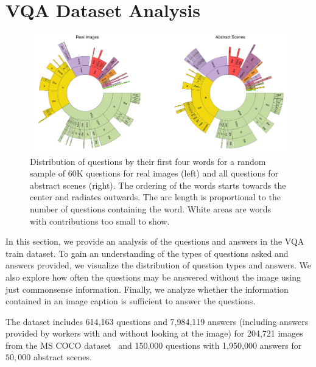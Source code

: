 \section{VQA Dataset Analysis}
\label{sec:analysis}
\begin{figure}[t]
\centering
\includegraphics[width=1\linewidth]{figures/QuestionTypes3.pdf}
\caption{Distribution of questions by their first four words for a random sample of 60K questions for real images (left) and all questions for abstract scenes (right). The ordering of the words starts towards the center and radiates outwards. The arc length is proportional to the number of questions containing the word. White areas are words with contributions too small to show. }
\label{fig:QuesCluster}
\end{figure}

In this section, we provide an analysis of the questions and answers in the VQA train dataset.
To gain an understanding of the types of questions asked and answers provided, we visualize
the distribution of question types and answers. We also explore how often the questions may
be answered without the image using just commonsense information. Finally, we analyze whether
the information contained in an image caption is sufficient to answer the questions.

The dataset includes 614,163 questions 
and 7,984,119 answers (including answers provided by workers with and without 
looking at the image) 
for 204,721 images from the MS COCO dataset~\cite{coco} and 150,000 questions with 1,950,000 answers for $50,000$ abstract scenes.


